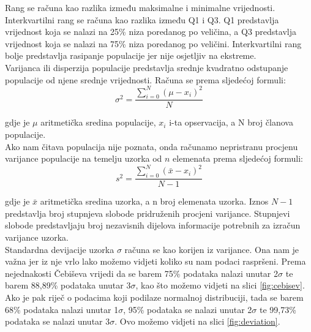\documentclass[times,utf8,zavrsni]{fer}
\begin{document}
Rang se računa kao razlika između maksimalne i minimalne vrijednosti. Interkvartilni rang se računa kao razlika između Q1 i Q3. Q1 predstavlja vrijednost koja se nalazi na 25\% niza poredanog po veličina, a Q3 predstavlja vrijednost koja se nalazi na 75\% niza poredanog po veličini. Interkvartilni rang bolje predstavlja rasipanje populacije jer nije osjetljiv na ekstreme. \\

Varijanca ili disperzija populacije predstavlja srednje kvadratno odstupanje populacije od njene srednje vrijednosti. Računa se prema sljedećoj formuli: \\
\begin{equation}
\label{variance}
\sigma ^2=\frac{\sum _{i=0}^N\left(\mu -x_{i}\right)^2}{N}
\end{equation}

\noindent gdje je ${\mu}$ aritmetička sredina populacije, ${x_{i}}$ i-ta opservacija, a N broj članova populacije. \\

Ako nam čitava populacija nije poznata, onda računamo nepristranu procjenu varijance populacije na temelju uzorka od ${n}$ elemenata prema sljedećoj formuli: \\
\begin{equation}
\label{procj}
s ^2=\frac{\sum _{i=0}^N\left(\bar{x} -x_{i}\right)^2}{N-1}
\end{equation}

\noindent gdje je ${\bar{x}}$ aritmetička sredina uzorka, a n broj elemenata uzorka. Iznos ${N-1}$ predstavlja broj stupnjeva slobode pridruženih procjeni varijance. Stupnjevi slobode predstavljaju broj nezavisnih dijelova informacije potrebnih za izračun varijance uzorka. \\

Standardna devijacije uzorka ${\sigma}$ računa se kao korijen iz varijance. Ona nam je važna jer iz nje vrlo lako možemo vidjeti koliko su nam podaci raspršeni. Prema nejednakosti Čebiševa vrijedi da se barem 75\% podataka nalazi unutar 2${\sigma}$ te barem 88,89\% podataka unutar 3${\sigma}$, kao što možemo vidjeti na slici \ref{fig:cebisev}. Ako je pak riječ o podacima koji podilaze normalnoj distribuciji, tada se barem 68\% podataka nalazi unutar 1${\sigma}$, 95\% podataka se nalazi unutar 2${\sigma}$ te 99,73\% podataka se nalazi unutar 3${\sigma}$. Ovo možemo vidjeti na slici \ref{fig:deviation}. \\
\end{document}

